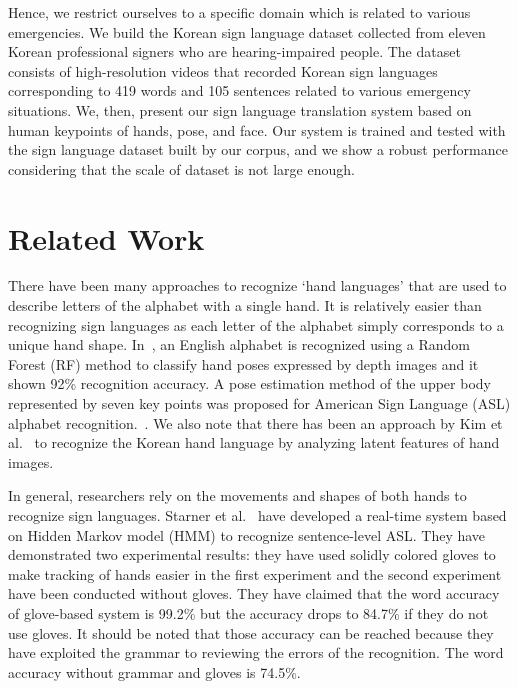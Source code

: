 \documentclass[10pt,twocolumn,letterpaper]{article}
\begin{document}
Hence, we restrict ourselves to a specific domain which is related to various emergencies. We build the Korean sign language dataset collected from eleven Korean professional signers who are hearing-impaired people. The dataset consists of high-resolution videos that recorded Korean sign languages corresponding to 419 words and 105 sentences related to various emergency situations.
We, then, present our sign language translation system based on human keypoints of hands, pose, and face. Our system is trained and tested with the sign language dataset built by our corpus, and we show a robust performance considering that the scale of dataset is not large enough.

\section{Related Work}
There have been many approaches to recognize `hand languages' that are used to describe letters of the alphabet with a single hand. It is relatively easier than recognizing sign languages as each letter of the alphabet simply corresponds to a unique hand shape. %
In~\cite{DongLY15}, an English alphabet is recognized using a Random Forest (RF) method to classify hand poses expressed by depth images and it shown 92\% recognition accuracy. A pose estimation method of the upper body represented by seven key points was proposed for American Sign Language (ASL) alphabet recognition.~\cite{gattupalli2016evaluation}. We also note that there has been an approach by Kim et al.~\cite{KimK16} to recognize the Korean hand language by analyzing latent features of hand images.

In general, researchers rely on the movements and shapes of both hands to recognize sign languages. Starner et al.~\cite{StarnerP95} have developed a real-time system based on Hidden Markov model (HMM) to recognize sentence-level ASL. They have demonstrated two experimental results: they have used solidly colored gloves to make tracking of hands easier in the first experiment and the second experiment have been conducted without gloves. They have claimed that the word accuracy of glove-based system is 99.2\% but the accuracy drops to 84.7\% if they do not use gloves. It should be noted that those accuracy can be reached because they have exploited the grammar to reviewing the errors of the recognition. The word accuracy without grammar and gloves is 74.5\%.
\end{document}
